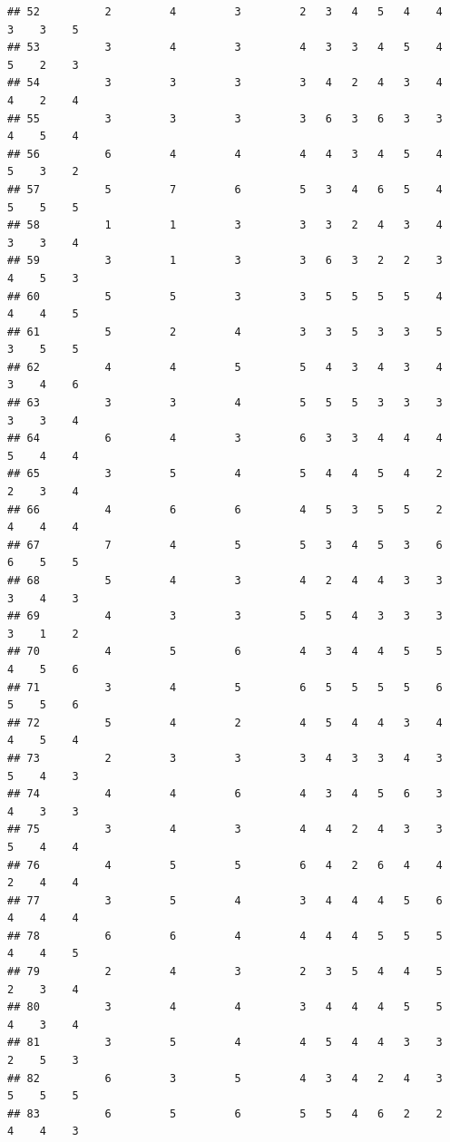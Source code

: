 \documentclass[
]{article}
\begin{document}
\begin{verbatim}
## 52          2         4         3         2   3   4   5   4    4    3    3    5
## 53          3         4         3         4   3   3   4   5    4    5    2    3
## 54          3         3         3         3   4   2   4   3    4    4    2    4
## 55          3         3         3         3   6   3   6   3    3    4    5    4
## 56          6         4         4         4   4   3   4   5    4    5    3    2
## 57          5         7         6         5   3   4   6   5    4    5    5    5
## 58          1         1         3         3   3   2   4   3    4    3    3    4
## 59          3         1         3         3   6   3   2   2    3    4    5    3
## 60          5         5         3         3   5   5   5   5    4    4    4    5
## 61          5         2         4         3   3   5   3   3    5    3    5    5
## 62          4         4         5         5   4   3   4   3    4    3    4    6
## 63          3         3         4         5   5   5   3   3    3    3    3    4
## 64          6         4         3         6   3   3   4   4    4    5    4    4
## 65          3         5         4         5   4   4   5   4    2    2    3    4
## 66          4         6         6         4   5   3   5   5    2    4    4    4
## 67          7         4         5         5   3   4   5   3    6    6    5    5
## 68          5         4         3         4   2   4   4   3    3    3    4    3
## 69          4         3         3         5   5   4   3   3    3    3    1    2
## 70          4         5         6         4   3   4   4   5    5    4    5    6
## 71          3         4         5         6   5   5   5   5    6    5    5    6
## 72          5         4         2         4   5   4   4   3    4    4    5    4
## 73          2         3         3         3   4   3   3   4    3    5    4    3
## 74          4         4         6         4   3   4   5   6    3    4    3    3
## 75          3         4         3         4   4   2   4   3    3    5    4    4
## 76          4         5         5         6   4   2   6   4    4    2    4    4
## 77          3         5         4         3   4   4   4   5    6    4    4    4
## 78          6         6         4         4   4   4   5   5    5    4    4    5
## 79          2         4         3         2   3   5   4   4    5    2    3    4
## 80          3         4         4         3   4   4   4   5    5    4    3    4
## 81          3         5         4         4   5   4   4   3    3    2    5    3
## 82          6         3         5         4   3   4   2   4    3    5    5    5
## 83          6         5         6         5   5   4   6   2    2    4    4    3

\end{verbatim}
\end{document}
